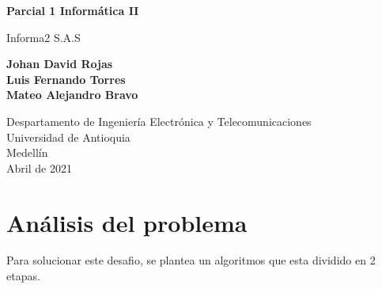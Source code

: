 \documentclass{article}
\begin{document}
\begin{titlepage}
    \begin{center}
        \vspace*{1cm}
            
        \Huge
        \textbf{Parcial 1 Informática II}
            
        \vspace{0.5cm}
        \LARGE
        Informa2 S.A.S
            
        \vspace{1.5cm}
            
        \textbf{Johan David Rojas\\Luis Fernando Torres\\Mateo Alejandro Bravo}
            
        \vfill
            
        \vspace{0.8cm}
            
        \Large
        Despartamento de Ingeniería Electrónica y Telecomunicaciones\\
        Universidad de Antioquia\\
        Medellín\\
        Abril de 2021
            
    \end{center}
\end{titlepage}

\tableofcontents
\newpage
\section{Análisis del problema}\label{analisis}
Para solucionar este desafio, se plantea un algoritmos que esta dividido en 2 etapas.
\end{document}
